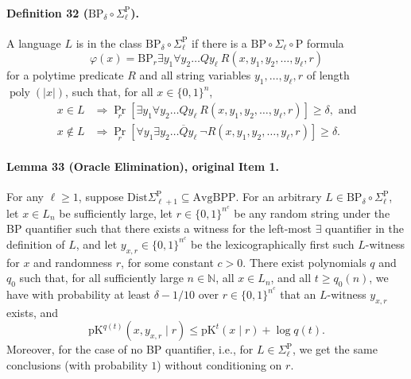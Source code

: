\documentclass[10pt,a4paper]{article}
\begin{document}
\paragraph{Definition 32 ($\mathrm{BP}_\delta\circ\Sigma_\ell^\mathrm P$).} A language $L$ is in the class $\mathrm{BP}_\delta\circ\Sigma_\ell^\mathrm P$ if there is a $\mathrm{BP}\circ\Sigma_\ell\circ\mathrm P$ formula
\[\varphi(x)=\mathrm{BP}_r\exists y_1\forall y_2\ldots Qy_\ell\ R(x,y_1,y_2,\ldots,y_\ell,r)\]
for a polytime predicate $R$ and all string variables $y_1,\ldots,y_\ell,r$ of length $\operatorname{poly}(|x|)$, such that, for all $x\in\{0,1\}^n$,
\begin{align*}
x\in L&\Longrightarrow\Pr_r[\exists y_1\forall y_2\ldots Qy_\ell\ R(x,y_1,y_2,\ldots,y_\ell,r)]\geq\delta,\text{ and}\\
x\notin L&\Longrightarrow\Pr_r[\forall y_1\exists y_2\ldots\overline Qy_\ell\ \neg R(x,y_1,y_2,\ldots,y_\ell,r)]\geq\delta.
\end{align*}
\paragraph{Lemma 33 (Oracle Elimination), original Item 1.} For any $\ell\geq1$, suppose $\mathrm{Dist}\Sigma_{\ell+1}^{\mathrm P}\subseteq\mathrm{AvgBPP}$. For an arbitrary $L\in\mathrm{BP}_\delta\circ\Sigma_\ell^{\mathrm P}$, let $x\in L_n$ be sufficiently large, let $r\in\{0,1\}^{n^c}$ be any random string under the BP quantifier such that there exists a witness for the left-most $\exists$ quantifier in the definition of $L$, and let $y_{x,r}\in\{0,1\}^{n^c}$ be the lexicographically first such $L$-witness for $x$ and randomness $r$, for some constant $c>0$.
There exist polynomials $q$ and $q_0$ such that, for all sufficiently large $n\in\mathbb N$, all $x\in L_n$, and all $t\geq q_0(n)$, we have with probability at least $\delta-1/10$ over $r\in\{0,1\}^{n^c}$ that an $L$-witness $y_{x,r}$ exists, and
\[\mathrm{pK}^{q(t)}(x,y_{x,r}\mid r)\leq\mathrm{pK}^t(x\mid r)+\log q(t).\]
Moreover, for the case of no BP quantifier, i.e., for $L\in\Sigma_\ell^{\mathrm P}$, we get the same conclusions (with probability $1$) without conditioning on $r$.
\end{document}
